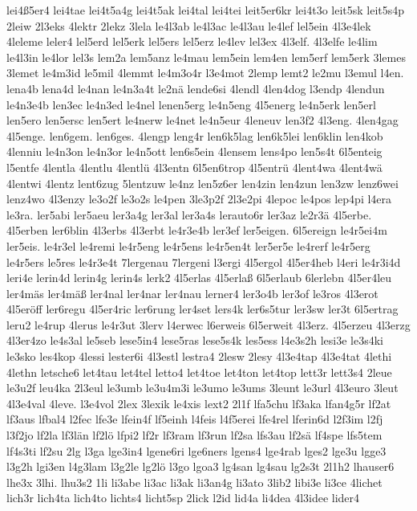 {lei4ß5er4
lei4tae
lei4t5a4g
lei4t5ak
lei4tal
lei4tei
leit5er6kr
lei4t3o
leit5sk
leit5s4p
2leiw
2l3eks
4lektr
2lekz
3lela
le4l3ab
le4l3ac
le4l3au
le4lef
lel5ein
4l3e4lek
4leleme
leler4
lel5erd
lel5erk
lel5ers
lel5erz
le4lev
lel3ex
4l3elf.
4l3elfe
le4lim
le4l3in
le4lor
lel3s
lem2a
lem5anz
le4mau
lem5ein
lem4en
lem5erf
lem5erk
3lemes
3lemet
le4m3id
le5mil
4lemmt
le4m3o4r
l3e4mot
2lemp
lemt2
le2mu
l3emul
l4en.
lena4b
lena4d
le4nan
le4n3a4t
le2nä
lende6si
4lendl
4len4dog
l3endp
4lendun
le4n3e4b
len3ec
le4n3ed
le4nel
lenen5erg
le4n5eng
4l5energ
le4n5erk
len5erl
len5ero
len5ersc
len5ert
le4nerw
le4net
le4n5eur
4leneuv
len3f2
4l3eng.
4len4gag
4l5enge.
len6gem.
len6ges.
4lengp
leng4r
len6k5lag
len6k5lei
len6klin
len4kob
4lenniu
le4n3on
le4n3or
le4n5ott
len6s5ein
4lensem
lens4po
len5s4t
6l5enteig
l5entfe
4lentla
4lentlu
4lentlü
4l3entn
6l5en6trop
4l5entrü
4lent4wa
4lent4wä
4lentwi
4lentz
lent6zug
5lentzuw
le4nz
len5z6er
len4zin
len4zun
len3zw
lenz6wei
lenz4wo
4l3enzy
le3o2f
le3o2s
le4pen
3le3p2f
2l3e2pi
4lepoc
le4pos
lep4pi
l4era
le3ra.
ler5abi
ler5aeu
ler3a4g
ler3al
ler3a4s
lerauto6r
ler3az
le2r3ä
4l5erbe.
4l5erben
ler6blin
4l3erbs
4l3erbt
le4r3e4b
ler3ef
ler5eigen.
6l5ereign
le4r5ei4m
ler5eis.
le4r3el
le4remi
le4r5eng
le4r5ens
le4r5en4t
ler5er5e
le4rerf
le4r5erg
le4r5ers
le5res
le4r3e4t
7lergenau
7lergeni
l3ergi
4l5ergol
4l5er4heb
l4eri
le4r3i4d
leri4e
lerin4d
lerin4g
lerin4s
lerk2
4l5erlas
4l5erlaß
6l5erlaub
6lerlebn
4l5er4leu
ler4mäs
ler4mäß
ler4nal
ler4nar
ler4nau
lerner4
ler3o4b
ler3of
le3ros
4l3erot
4l5eröff
ler6regu
4l5er4ric
ler6rung
ler4set
lers4k
ler6s5tur
ler3sw
ler3t
6l5ertrag
leru2
le4rup
4lerus
le4r3ut
3lerv
l4erwec
l6erweis
6l5erweit
4l3erz.
4l5erzeu
4l3erzg
4l3er4zo
le4s3al
le5seb
lese5in4
lese5ras
lese5s4k
les5ess
l4e3s2h
lesi3e
le3s4ki
le3sko
les4kop
4lessi
lester6i
4l3estl
lestra4
2lesw
2lesy
4l3e4tap
4l3e4tat
4lethi
4lethn
letsche6
let4tau
let4tel
letto4
let4toe
let4ton
let4top
lett3r
lett3s4
2leue
le3u2f
leu4ka
2l3eul
le3umb
le3u4m3i
le3umo
le3ums
3leunt
le3url
4l3euro
3leut
4l3e4val
4leve.
l3e4vol
2lex
3lexik
le4xis
lext2
2l1f
lfa5chu
lf3aka
lfan4g5r
lf2at
lf3aus
lfbal4
l2fec
lfe3e
lfein4f
lf5einh
l4feis
l4f5erei
lfe4rel
lferin6d
l2f3im
l2fj
l3f2jo
lf2la
lf3län
lf2lö
lfpi2
lf2r
lf3ram
lf3run
lf2sa
lfs3au
lf2sä
lf4spe
lfs5tem
lf4s3ti
lf2su
2lg
l3ga
lge3in4
lgene6ri
lge6ners
lgens4
lge4rab
lges2
lge3u
lgge3
l3g2h
lgi3en
l4g3lam
l3g2le
lg2lö
l3go
lgoa3
lg4san
lg4sau
lg2s3t
2l1h2
lhauser6
lhe3x
3lhi.
lhu3s2
1li
li3abe
li3ac
li3ak
li3an4g
li3ato
3lib2
libi3e
li3ce
4lichet
lich3r
lich4ta
lich4to
lichts4
licht5sp
2lick
l2id
lid4a
li4dea
4l3idee
lider4
}

